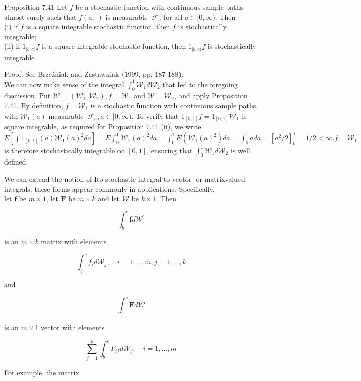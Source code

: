\documentclass[10pt]{article}
\begin{document}
Proposition 7.41 Let $f$ be a stochastic function with continuous sample paths almost surely such that $f(a, \cdot)$ is measurable- $\mathcal{F}_{a}$ for all $a \in[0, \infty)$. Then\\
(i) if $f$ is a square integrable stochastic function, then $f$ is stochastically integrable;\\
(ii) if $1_{[b, c)} f$ is a square integrable stochastic function, then $1_{[b, c)} f$ is stochastically integrable.

Proof. See Brzeźniak and Zastawniak (1999, pp. 187-188).\\
We can now make sense of the integral $\int_{0}^{1} \mathcal{W}_{1} d \mathcal{W}_{2}$ that led to the foregoing discussion. Put $\mathcal{W}=\left(\mathcal{W}_{1}, \mathcal{W}_{2}\right), f=\mathcal{W}_{1}$ and $\mathcal{W}=\mathcal{W}_{2}$, and apply Proposition 7.41. By definition, $f=\mathcal{W}_{1}$ is a stochastic function with continuous sample paths, with $\mathcal{W}_{1}(a)$ measurable- $\mathcal{F}_{a}, a \in[0, \infty)$. To verify that $1_{[0,1]} f=1_{[0,1]} \mathcal{W}_{1}$ is square integrable, as required for Proposition 7.41 (ii), we write $E\left[\int 1_{[0,1]}(a) \mathcal{W}_{1}(a)^{2} d a\right]=E \int_{0}^{1} \mathcal{W}_{1}(a)^{2} d a=\int_{0}^{1} E\left(\mathcal{W}_{1}(a)^{2}\right) d a= \int_{0}^{1} a d a=\left[a^{2} / 2\right]_{0}^{1}=1 / 2<\infty . f=\mathcal{W}_{1}$ is therefore stochastically integrable on $[0,1]$, ensuring that $\int_{0}^{1} \mathcal{W}_{1} d \mathcal{W}_{2}$ is well defined.

We can extend the notion of Ito stochastic integral to vector- or matrixvalued integrals; these forms appear commonly in applications. Specifically,\\
let $\mathbf{f}$ be $m \times 1$, let $\mathbf{F}$ be $m \times k$ and let $\mathcal{W}$ be $k \times 1$. Then

$$
\int_{b}^{c} \mathbf{f} d \mathcal{W}^{\prime}
$$

is an $m \times k$ matrix with elements

$$
\int_{b}^{c} f_{i} d \mathcal{W}_{j}, \quad i=1, \ldots, m, j=1, \ldots, k
$$

and

$$
\int_{b}^{c} \mathbf{F} d \mathcal{W}
$$

is an $m \times 1$ vector with elements

$$
\sum_{j=1}^{k} \int_{b}^{c} F_{i j} d \mathcal{W}_{j}, \quad i=1, \ldots, m
$$

For example, the matrix
\end{document}
